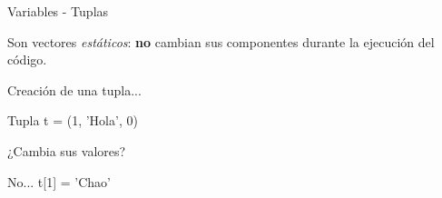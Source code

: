 \begin{frame}[t]{Variables - Tuplas}\vspace{10pt}

Son vectores \textit{estáticos}: \textbf{no} cambian sus componentes durante la ejecución del código.

\vspace{5pt}

Creación de una tupla...
\begin{block}{Tupla}
t = (1, 'Hola', 0)
\end{block}

¿Cambia sus valores?
\begin{block}{No...}
t[1] = 'Chao'
\end{block}

\end{frame}